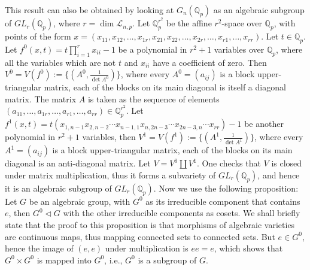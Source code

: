 \documentclass{article}
\begin{document}
This result can also be obtained by looking at $G_{n}(\mathbb{Q}_{p})$ as an algebraic subgroup of $GL_{r}(\mathbb{Q}_{p})$, where $r=\dim\mathcal{L}_{n,p}$. Let $\mathbb{Q}_{p}^{r^2}$ be the affine $r^2$-space over $\mathbb{Q}_{p}$, with points of the form $x=(x_{11},x_{12},\dots,x_{1r},x_{21},x_{22},\dots,x_{2r},\dots,x_{r1},\dots,x_{rr})$. Let $t\in\mathbb{Q}_{p}$. Let $f^{0}(x,t)=t\prod_{i=1}^{r}x_{ii}-1$ be a polynomial in $r^2+1$ variables over $\mathbb{Q}_{p}$, where all the variables which are not $t$ and $x_{ii}$ have a coefficient of zero. Then $V^{0}=V(f^{0}):=\{(A^{0},\frac{1}{\det{A^{0}}})\}$, where every $A^{0}=(a_{ij})$ is a block upper-triangular matrix, each of the blocks on its main diagonal is itself a diagonal matrix. The matrix $A$ is taken as the sequence of elements $(a_{11},\dots,a_{1r},\dots,a_{r1},\dots,a_{rr})\in\mathbb{Q}_{p}^{r^2}$. Let $f^{1}(x,t)=t(x_{1,n-1}x_{2,n-2}\cdots{x_{n-1,1}}x_{n,2n-3}\cdots{x_{2n-3,n}}\cdots{x_{rr}})-1$ be another polynomial in $r^2+1$ variables, then $V^{1}=V(f^{1}):=\{(A^{1},\frac{1}{\det{A^{1}}})\}$, where every $A^{1}=(a_{ij})$ is a block upper-triangular matrix, each of the blocks on its main diagonal is an anti-diagonal matrix.
Let $V=V^{0}\coprod{V^{1}}$. One checks that $V$ is closed under matrix multiplication, thus it forms a subvariety of $GL_{r}(\mathbb{Q}_{p})$, and hence it is an algebraic subgroup of $GL_{r}(\mathbb{Q}_{p})$. Now we use the following proposition: Let $G$ be an algebraic group, with $G^{0}$ as its irreducible component that contains $e$, then $G^{0}\triangleleft{G}$ with the other irreducible components as cosets. We shall briefly state that the proof to this proposition is that morphisms of algebraic varieties are continuous maps, thus mapping connected sets to connected sets. But $e\in{G^{0}}$, hence the image of $(e,e)$ under multiplication is $ee=e$, which shows that $G^{0}\times{G^{0}}$ is mapped into $G^{0}$, i.e., $G^{0}$ is a subgroup of $G$.
\end{document}
